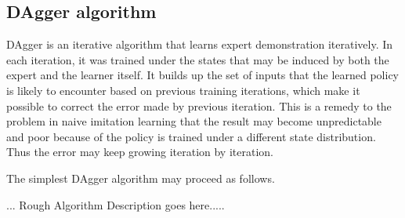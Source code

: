 \documentclass[twoside]{article}
\begin{document}







\subsection{DAgger algorithm}
DAgger is an iterative algorithm that learns expert demonstration iteratively. In each iteration, it was trained under the states that may be induced by both the expert and the learner itself. It builds up the set of inputs that the learned policy is likely to encounter based on previous training iterations, which make it possible to correct the error made by previous iteration. This is a remedy to the problem in naive imitation learning that the result may become unpredictable and poor because of the policy is trained under a different state distribution. Thus the error may keep growing iteration by iteration.

The simplest DAgger algorithm may proceed as follows.


... Rough Algorithm Description goes here.....



\end{document}
